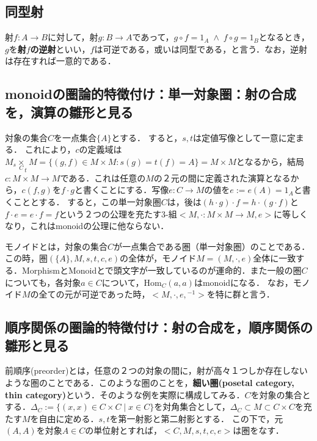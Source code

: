 \documentclass[uplatex, 12pt, dvipdfmx]{jsreport}
\begin{document}
\subsection{同型射}

\begin{shadebox}\begin{definition}[可逆，同型，逆射]
    射$f:A\rightarrow B$に対して，射$g:B\rightarrow A$であって，$g\circ f=1_A \; \wedge \; f\circ g=1_B$となるとき，$g$を\textbf{射$f$の逆射}といい，$f$は可逆である，或いは同型である，と言う．なお，逆射は存在すれば一意的である．
\end{definition}\end{shadebox}

\subsection{monoidの圏論的特徴付け：単一対象圏：射の合成を，演算の雛形と見る}

対象の集合$C$を一点集合$\{ A\}$とする．
すると，$s,t$は定値写像として一意に定まる．
これにより，$c$の定義域は$M_s\underset{C}{\times}_tM=\{ (g,f)\in M\times M : s(g)=t(f)=A \}=M\times M$となるから，結局$c:M\times M\rightarrow M$である．これは任意の$M$の２元の間に定義された演算となるから，$c(f,g)$を$f\cdot g$と書くことにする．写像$e:C\rightarrow M$の値を$e:=e(A)=1_A$と書くこととする．
すると，この単一対象圏$C$は，後は$(h\cdot g)\cdot f = h\cdot (g\cdot f)$と$f\cdot e=e\cdot f = f$という２つの公理を充たす3-組$<M,\cdot :M\times M\rightarrow M,e>$に等しくなり，これはmonoidの公理に他ならない．

\begin{screen}
    モノイドとは，対象の集合$C$が一点集合である圏（単一対象圏）のことである．この時，圏$(\{ A\}, M, s, t, c, e)$の全体が，モノイド$M=(M,\cdot,e)$全体に一致する．MorphismとMonoidとで頭文字が一致しているのが運命的．また一般の圏$C$についても，各対象$a\in C$について，$\mathrm{Hom}_C(a,a)$はmonoidになる．
    なお，モノイド$M$の全ての元が可逆であった時，$<M,\cdot,e,{}^{-1}>$を特に群と言う．
\end{screen}

\subsection{順序関係の圏論的特徴付け：射の合成を，順序関係の雛形と見る}

前順序(preorder)とは，任意の２つの対象の間に，射が高々１つしか存在しないような圏のことである．このような圏のことを，\textbf{細い圏(posetal category, thin category)}という．そのような例を実際に構成してみる．$C$を対象の集合とする．$\Delta_C :=\{ (x,x)\in C\times C \mid x\in C \}$を対角集合として，$\Delta_C \subset M\subset C\times C$を充たす$M$を自由に定める．$s,t$を第一射影と第二射影とする．
この下で，元$(A,A)$を対象$A\in C$の単位射とすれば，$<C,M,s,t,c,e>$は圏をなす．
\end{document}
